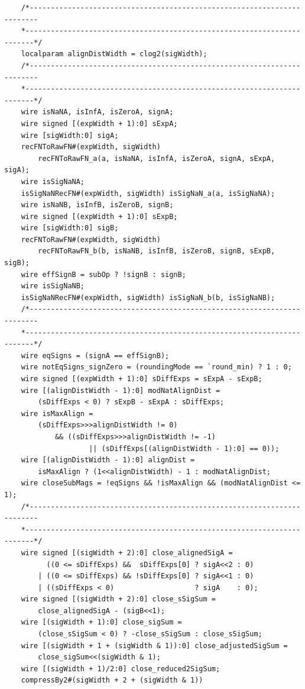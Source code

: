 \documentclass[12pt,letter]{article}
\begin{document}
\begin{lstlisting}
    /*------------------------------------------------------------------------
    *------------------------------------------------------------------------*/
    localparam alignDistWidth = clog2(sigWidth);
    /*------------------------------------------------------------------------
    *------------------------------------------------------------------------*/
    wire isNaNA, isInfA, isZeroA, signA;
    wire signed [(expWidth + 1):0] sExpA;
    wire [sigWidth:0] sigA;
    recFNToRawFN#(expWidth, sigWidth)
        recFNToRawFN_a(a, isNaNA, isInfA, isZeroA, signA, sExpA, sigA);
    wire isSigNaNA;
    isSigNaNRecFN#(expWidth, sigWidth) isSigNaN_a(a, isSigNaNA);
    wire isNaNB, isInfB, isZeroB, signB;
    wire signed [(expWidth + 1):0] sExpB;
    wire [sigWidth:0] sigB;
    recFNToRawFN#(expWidth, sigWidth)
        recFNToRawFN_b(b, isNaNB, isInfB, isZeroB, signB, sExpB, sigB);
    wire effSignB = subOp ? !signB : signB;
    wire isSigNaNB;
    isSigNaNRecFN#(expWidth, sigWidth) isSigNaN_b(b, isSigNaNB);
    /*------------------------------------------------------------------------
    *------------------------------------------------------------------------*/
    wire eqSigns = (signA == effSignB);
    wire notEqSigns_signZero = (roundingMode == `round_min) ? 1 : 0;
    wire signed [(expWidth + 1):0] sDiffExps = sExpA - sExpB;
    wire [(alignDistWidth - 1):0] modNatAlignDist =
        (sDiffExps < 0) ? sExpB - sExpA : sDiffExps;
    wire isMaxAlign =
        (sDiffExps>>>alignDistWidth != 0)
            && ((sDiffExps>>>alignDistWidth != -1)
                    || (sDiffExps[(alignDistWidth - 1):0] == 0));
    wire [(alignDistWidth - 1):0] alignDist =
        isMaxAlign ? (1<<alignDistWidth) - 1 : modNatAlignDist;
    wire closeSubMags = !eqSigns && !isMaxAlign && (modNatAlignDist <= 1);
    /*------------------------------------------------------------------------
    *------------------------------------------------------------------------*/
    wire signed [(sigWidth + 2):0] close_alignedSigA =
          ((0 <= sDiffExps) &&  sDiffExps[0] ? sigA<<2 : 0)
        | ((0 <= sDiffExps) && !sDiffExps[0] ? sigA<<1 : 0)
        | ((sDiffExps < 0)                   ? sigA    : 0);
    wire signed [(sigWidth + 2):0] close_sSigSum =
        close_alignedSigA - (sigB<<1);
    wire [(sigWidth + 1):0] close_sigSum =
        (close_sSigSum < 0) ? -close_sSigSum : close_sSigSum;
    wire [(sigWidth + 1 + (sigWidth & 1)):0] close_adjustedSigSum =
        close_sigSum<<(sigWidth & 1);
    wire [(sigWidth + 1)/2:0] close_reduced2SigSum;
    compressBy2#(sigWidth + 2 + (sigWidth & 1))

\end{lstlisting}
\end{document}
